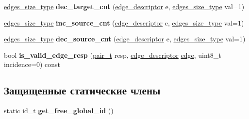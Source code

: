 \begin{DoxyCompactItemize}
\mbox{\label{class_s_p_u___g_r_a_p_h_1_1_spu_ultra_graph_aecd72c93789f6e72393bb4caa65f2890}} 
\hyperlink{class_s_p_u___g_r_a_p_h_1_1_spu_ultra_graph_a82496f8d87c7dfab766f15a989a05aa4}{edges\+\_\+size\+\_\+type} {\bfseries dec\+\_\+target\+\_\+cnt} (\hyperlink{class_s_p_u___g_r_a_p_h_1_1_spu_ultra_graph_a5f3776e003ef0a1648f1d9f84289810b}{edge\+\_\+descriptor} e, \hyperlink{class_s_p_u___g_r_a_p_h_1_1_spu_ultra_graph_a82496f8d87c7dfab766f15a989a05aa4}{edges\+\_\+size\+\_\+type} val=1)
\item 
\mbox{\label{class_s_p_u___g_r_a_p_h_1_1_spu_ultra_graph_a0c708ee126c83806d8bfacd380951f34}} 
\hyperlink{class_s_p_u___g_r_a_p_h_1_1_spu_ultra_graph_a82496f8d87c7dfab766f15a989a05aa4}{edges\+\_\+size\+\_\+type} {\bfseries inc\+\_\+source\+\_\+cnt} (\hyperlink{class_s_p_u___g_r_a_p_h_1_1_spu_ultra_graph_a5f3776e003ef0a1648f1d9f84289810b}{edge\+\_\+descriptor} e, \hyperlink{class_s_p_u___g_r_a_p_h_1_1_spu_ultra_graph_a82496f8d87c7dfab766f15a989a05aa4}{edges\+\_\+size\+\_\+type} val=1)
\item 
\mbox{\label{class_s_p_u___g_r_a_p_h_1_1_spu_ultra_graph_ae846ac80c5e12c728da4b61406591448}} 
\hyperlink{class_s_p_u___g_r_a_p_h_1_1_spu_ultra_graph_a82496f8d87c7dfab766f15a989a05aa4}{edges\+\_\+size\+\_\+type} {\bfseries dec\+\_\+source\+\_\+cnt} (\hyperlink{class_s_p_u___g_r_a_p_h_1_1_spu_ultra_graph_a5f3776e003ef0a1648f1d9f84289810b}{edge\+\_\+descriptor} e, \hyperlink{class_s_p_u___g_r_a_p_h_1_1_spu_ultra_graph_a82496f8d87c7dfab766f15a989a05aa4}{edges\+\_\+size\+\_\+type} val=1)
\item 
\mbox{\label{class_s_p_u___g_r_a_p_h_1_1_spu_ultra_graph_a256800f8d21b759cb2b40f170cb7a808}} 
bool {\bfseries is\+\_\+valid\+\_\+edge\+\_\+resp} (\hyperlink{struct_s_p_u_1_1pair__containter}{pair\+\_\+t} resp, \hyperlink{class_s_p_u___g_r_a_p_h_1_1_spu_ultra_graph_a5f3776e003ef0a1648f1d9f84289810b}{edge\+\_\+descriptor} \hyperlink{class_s_p_u___g_r_a_p_h_1_1_spu_ultra_graph_a51468aa2278d3abb0c338ffbeac7747a}{edge}, uint8\+\_\+t incidence=0) const
\end{DoxyCompactItemize}
\subsection*{Защищенные статические члены}
\begin{DoxyCompactItemize}
\item 
\mbox{\label{class_s_p_u___g_r_a_p_h_1_1_spu_ultra_graph_ab121f2ee5eaa47372394fe785ae80b43}} 
static id\+\_\+t {\bfseries get\+\_\+free\+\_\+global\+\_\+id} ()
\end{DoxyCompactItemize}


